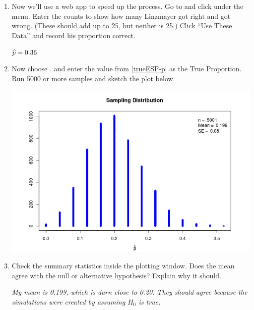 \begin{enumerate}
  \item Now we'll use a web app to speed up the process.  Go to
     \webAppURLFrst and click  under the  menu. 
       Enter the counts to show how many Linzmayer got right and got
       wrong. (These should add up to 25, but neither is 25.)
       Click ``Use These Data'' and record his proportion correct.

\begin{students}
  \vspace{1cm}
\end{students}
\begin{key}
{\it $\widehat{p} = 0.36$}
\end{key}

   \item Now  choose . and enter
     the value from \ref{trueESP-p} as the True Proportion.   Run 5000
     or more samples  and sketch the plot below.
\begin{students}
  \vspace{2cm}
\end{students}

\begin{key}
  \includegraphics[width = .5\linewidth]{../plots/ESP-5001Draws.png}
\end{key}

     \item Check the summary statistics inside the plotting window.
       Does the mean agree with the null or alternative hypothesis?
       Explain why it should.
\begin{students}
  \vspace{1.2cm}
\end{students}
\begin{key}
{\it My mean is 0.199, which is darn close to 0.20. They should agree
  because the simulations were created by assuming $H_0$ is true.}
\end{key}
\\


\end{enumerate}
